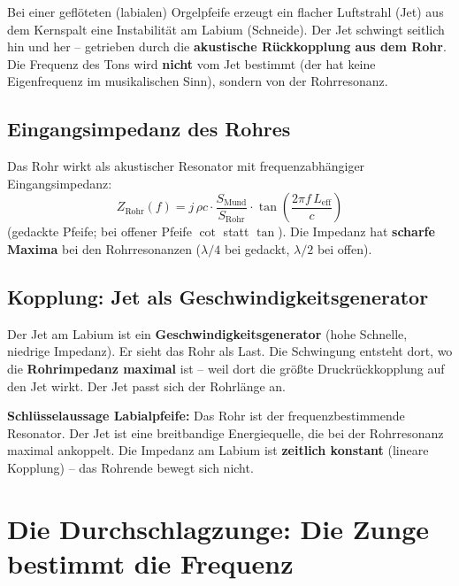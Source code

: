 \documentclass[11pt,a4paper]{article}
\begin{document}
Bei einer geflöteten (labialen) Orgelpfeife erzeugt ein flacher Luftstrahl (Jet) aus dem Kernspalt eine Instabilität am Labium (Schneide). Der Jet schwingt seitlich hin und her -- getrieben durch die \textbf{akustische Rückkopplung aus dem Rohr}. Die Frequenz des Tons wird \textbf{nicht} vom Jet bestimmt (der hat keine Eigenfrequenz im musikalischen Sinn), sondern von der Rohrresonanz.

\subsection{Eingangsimpedanz des Rohres}

Das Rohr wirkt als akustischer Resonator mit frequenzabhängiger Eingangsimpedanz:
\begin{equation}
Z_\text{Rohr}(f) = j\,\rho c \cdot \frac{S_\text{Mund}}{S_\text{Rohr}} \cdot \tan\!\left(\frac{2\pi f\, L_\text{eff}}{c}\right)
\end{equation}
(gedackte Pfeife; bei offener Pfeife $\cot$ statt $\tan$). Die Impedanz hat \textbf{scharfe Maxima} bei den Rohrresonanzen ($\lambda/4$ bei gedackt, $\lambda/2$ bei offen).

\subsection{Kopplung: Jet als Geschwindigkeitsgenerator}

Der Jet am Labium ist ein \textbf{Geschwindigkeitsgenerator} (hohe Schnelle, niedrige Impedanz). Er \glqq{}sieht\grqq{} das Rohr als Last. Die Schwingung entsteht dort, wo die \textbf{Rohrimpedanz maximal} ist -- weil dort die größte Druckrückkopplung auf den Jet wirkt. Der Jet passt sich der Rohrlänge an.

\begin{keybox}
\textbf{Schlüsselaussage Labialpfeife:} Das Rohr ist der frequenzbestimmende Resonator. Der Jet ist eine breitbandige Energiequelle, die bei der Rohrresonanz maximal ankoppelt. Die Impedanz am Labium ist \textbf{zeitlich konstant} (lineare Kopplung) -- das Rohrende bewegt sich nicht.
\end{keybox}

\section{Die Durchschlagzunge: Die Zunge bestimmt die Frequenz}
\end{document}
